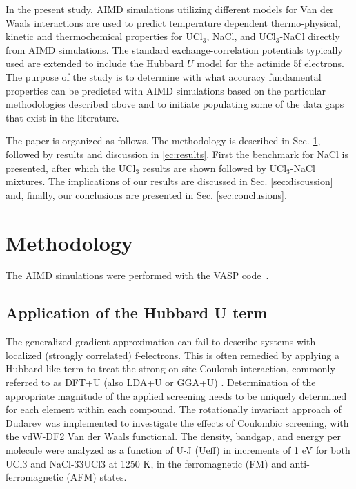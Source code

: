 \documentclass[preprint,3p,10pt,twocolumn,number,sort&compress]{elsarticle}
\begin{document}
In the present study, AIMD simulations utilizing different models for Van der Waals interactions are used to predict temperature dependent thermo-physical, kinetic and thermochemical properties for UCl$_3$, NaCl, and UCl$_3$-NaCl directly from AIMD simulations. The standard exchange-correlation potentials typically used are extended to include the Hubbard $U$  model for the actinide 5f electrons. The purpose of the study is to determine with what accuracy fundamental properties can be predicted with AIMD simulations based on the particular methodologies described above and to initiate populating some of the data gaps that exist in the literature. 

The paper is organized as follows. The methodology is described in Sec. \ref{sec:method}, followed by results and discussion in \ref{ec:results}. First the benchmark for NaCl is presented, after which the UCl$_3$ results are shown followed by UCl$_3$-NaCl mixtures. The implications of our results are discussed in Sec. \ref{sec:discussion} and, finally, our conclusions are presented in Sec. \ref{sec:conclusions}. 

\section{Methodology}
\label{sec:method}
The AIMD simulations were performed with the VASP code~\cite{}. 





\subsection{Application of the Hubbard U term}

The generalized gradient approximation can fail to describe systems with localized (strongly correlated) f-electrons. This is often remedied by applying a Hubbard-like term to treat the strong on-site Coulomb interaction, commonly referred to as DFT+U (also LDA+U or GGA+U) \cite{rohrbach2003}. Determination of the appropriate magnitude of the applied screening needs to be uniquely determined for each element within each compound. The rotationally invariant approach of Dudarev \cite{dudarev1998} was implemented to investigate the effects of Coulombic screening, with the vdW-DF2 Van der Waals functional. The density, bandgap, and energy per molecule were analyzed as a function of U-J (Ueff) in increments of 1 eV for both UCl3 and NaCl-33UCl3 at 1250 K, in the ferromagnetic (FM) and anti-ferromagnetic (AFM) states. 
\end{document}
